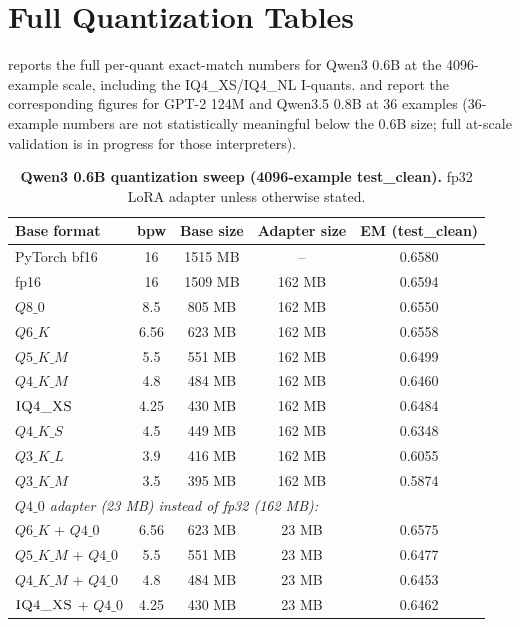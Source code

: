\section{Full Quantization Tables}
\label{appendix:quant_full}

 reports the full per-quant exact-match numbers for Qwen3 0.6B at the 4096-example scale, including the \textsc{IQ4\_XS}/\textsc{IQ4\_NL} I-quants.  and  report the corresponding figures for GPT-2 124M and Qwen3.5 0.8B at 36 examples (36-example numbers are not statistically meaningful below the 0.6B size; full at-scale validation is in progress for those interpreters).

\begin{table}[!h]
\centering
\caption{\label{tab:quant_qwen}\textbf{Qwen3 0.6B quantization sweep (4096-example test\_clean).} fp32 LoRA adapter unless otherwise stated.}
\small
\setlength{\tabcolsep}{4pt}
\begin{tabular}{@{}lcccc@{}}
\toprule
Base format & bpw & Base size & Adapter size & EM (test\_clean) \\
\midrule
PyTorch bf16        & 16    & 1515 MB & --     & 0.6580 \\
fp16                & 16    & 1509 MB & 162 MB & 0.6594 \\
$Q8\_0$             & 8.5   &  805 MB & 162 MB & 0.6550 \\
$Q6\_K$             & 6.56  &  623 MB & 162 MB & 0.6558 \\
$Q5\_K\_M$          & 5.5   &  551 MB & 162 MB & 0.6499 \\
$Q4\_K\_M$          & 4.8   &  484 MB & 162 MB & 0.6460 \\
$\textsc{IQ4\_XS}$  & 4.25  &  430 MB & 162 MB & 0.6484 \\
$Q4\_K\_S$          & 4.5   &  449 MB & 162 MB & 0.6348 \\
$Q3\_K\_L$          & 3.9   &  416 MB & 162 MB & 0.6055 \\
$Q3\_K\_M$          & 3.5   &  395 MB & 162 MB & 0.5874 \\
\midrule
\multicolumn{5}{l}{\emph{$Q4\_0$ adapter (23 MB) instead of fp32 (162 MB):}}\\
$Q6\_K$ + $Q4\_0$           & 6.56  & 623 MB & 23 MB & 0.6575 \\
$Q5\_K\_M$ + $Q4\_0$        & 5.5   & 551 MB & 23 MB & 0.6477 \\
$Q4\_K\_M$ + $Q4\_0$        & 4.8   & 484 MB & 23 MB & 0.6453 \\
$\textsc{IQ4\_XS}$ + $Q4\_0$ & 4.25 & 430 MB & 23 MB & 0.6462 \\
\bottomrule
\end{tabular}
\end{table}

